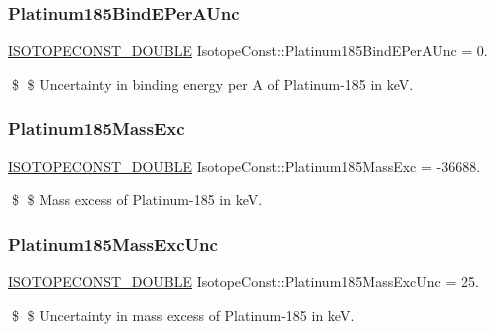 \subsubsection{\texorpdfstring{Platinum185\+Bind\+E\+Per\+A\+Unc}{Platinum185BindEPerAUnc}}
{\footnotesize\ttfamily \mbox{\hyperlink{group___isotope_const-_macros_ga8f45a7272ce02c0b4c65c44636ed719a}{I\+S\+O\+T\+O\+P\+E\+C\+O\+N\+S\+T\+\_\+\+D\+O\+U\+B\+LE}} Isotope\+Const\+::\+Platinum185\+Bind\+E\+Per\+A\+Unc = 0.}

\$ \$ Uncertainty in binding energy per A of Platinum-\/185 in keV. \mbox{\label{group___isotope_const-_platinum-_pt185_ga7e463410cb497c784ab6ad74641240c0}} 
\subsubsection{\texorpdfstring{Platinum185\+Mass\+Exc}{Platinum185MassExc}}
{\footnotesize\ttfamily \mbox{\hyperlink{group___isotope_const-_macros_ga8f45a7272ce02c0b4c65c44636ed719a}{I\+S\+O\+T\+O\+P\+E\+C\+O\+N\+S\+T\+\_\+\+D\+O\+U\+B\+LE}} Isotope\+Const\+::\+Platinum185\+Mass\+Exc = -\/36688.}

\$ \$ Mass excess of Platinum-\/185 in keV. \mbox{\label{group___isotope_const-_platinum-_pt185_ga023cce3ac9dd6bf01365f78c5d746297}} 
\subsubsection{\texorpdfstring{Platinum185\+Mass\+Exc\+Unc}{Platinum185MassExcUnc}}
{\footnotesize\ttfamily \mbox{\hyperlink{group___isotope_const-_macros_ga8f45a7272ce02c0b4c65c44636ed719a}{I\+S\+O\+T\+O\+P\+E\+C\+O\+N\+S\+T\+\_\+\+D\+O\+U\+B\+LE}} Isotope\+Const\+::\+Platinum185\+Mass\+Exc\+Unc = 25.}

\$ \$ Uncertainty in mass excess of Platinum-\/185 in keV. \mbox{\label{group___isotope_const-_platinum-_pt185_ga6d44aafdf5c30ee930c36e58cd089fe7}} 
